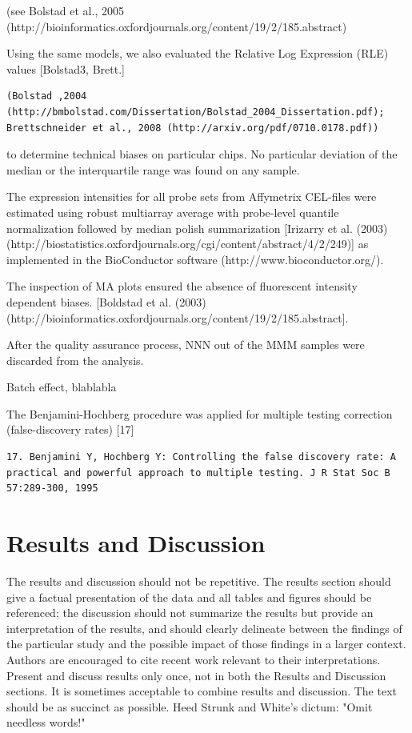 \documentclass[9pt,twocolumn,twoside]{gsajnl}
\begin{document}
(see Bolstad et al., 2005 (http://bioinformatics.oxfordjournals.org/content/19/2/185.abstract)

Using the same models, we also evaluated the Relative Log Expression (RLE) values [Bolstad3, Brett.]
\begin{verbatim}
(Bolstad ,2004
(http://bmbolstad.com/Dissertation/Bolstad_2004_Dissertation.pdf); Brettschneider et al., 2008 (http://arxiv.org/pdf/0710.0178.pdf))
\end{verbatim}
 to determine technical biases on particular chips. No particular deviation of the median or the interquartile range was found on any sample.

The expression intensities for all probe sets from Affymetrix CEL-files were estimated using robust multiarray average  with probe-level quantile normalization followed by median polish summarization [Irizarry et al. (2003) (http://biostatistics.oxfordjournals.org/cgi/content/abstract/4/2/249)] as implemented in the BioConductor software (http://www.bioconductor.org/).

The inspection of MA plots ensured the absence of fluorescent intensity dependent biases. [Boldstad et al. (2003)
(http://bioinformatics.oxfordjournals.org/content/19/2/185.abstract].

After the quality assurance process, NNN out of the MMM samples were discarded from the analysis.

Batch effect, blablabla


The Benjamini-Hochberg procedure was applied for multiple testing correction (false-discovery rates) [17]

\begin{verbatim}
17. Benjamini Y, Hochberg Y: Controlling the false discovery rate: A practical and powerful approach to multiple testing. J R Stat Soc B 57:289-300, 1995
\end{verbatim}

\section*{Results and Discussion}

The results and discussion should not be repetitive. The results section should give a factual presentation of the data and all tables and figures should be referenced; the discussion should not summarize the results but provide an interpretation of the results, and should clearly delineate between the findings of the particular study and the possible impact of those findings in a larger context. Authors are encouraged to cite recent work relevant to their interpretations. Present and discuss results only once, not in both the Results and Discussion sections. It is sometimes acceptable to combine results and discussion. The text should be as succinct as possible. Heed Strunk and White's dictum: "Omit needless words!"
\end{document}

